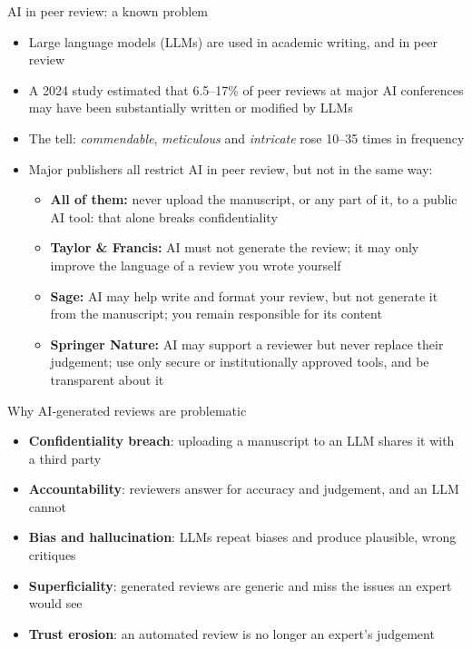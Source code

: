 \documentclass[aspectratio=169]{beamer}
\begin{document}
\begin{frame}{AI in peer review: a known problem}
\begin{itemize}
  \item Large language models (LLMs) are used in academic writing, and in peer review
  \item A 2024 study estimated that 6.5--17\% of peer reviews at major AI conferences may have been substantially written or modified by LLMs \citep{liang2024aireviews}
  \item The tell: \textit{commendable}, \textit{meticulous} and \textit{intricate} rose 10--35 times in frequency
  \item Major publishers all restrict AI in peer review, but not in the same way:
    \begin{itemize}
      \item \textbf{All of them:} never upload the manuscript, or any part of it, to a public AI tool: that alone breaks confidentiality
      \item \textbf{Taylor \& Francis:} AI must not generate the review; it may only improve the language of a review you wrote yourself
      \item \textbf{Sage:} AI may help write and format your review, but not generate it from the manuscript; you remain responsible for its content
      \item \textbf{Springer Nature:} AI may support a reviewer but never replace their judgement; use only secure or institutionally approved tools, and be transparent about it
    \end{itemize}
\end{itemize}
\end{frame}

\begin{frame}{Why AI-generated reviews are problematic}
\begin{itemize}
  \item \textbf{Confidentiality breach}: uploading a manuscript to an LLM shares it with a third party
  \item \textbf{Accountability}: reviewers answer for accuracy and judgement, and an LLM cannot
  \item \textbf{Bias and hallucination}: LLMs repeat biases and produce plausible, wrong critiques
  \item \textbf{Superficiality}: generated reviews are generic and miss the issues an expert would see
  \item \textbf{Trust erosion}: an automated review is no longer an expert's judgement
\end{itemize}
\end{frame}
\end{document}
